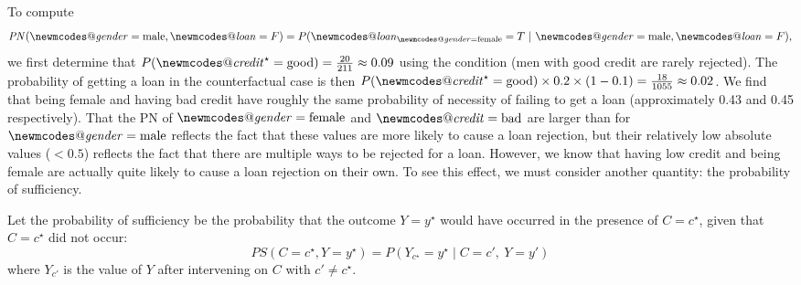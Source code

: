 \documentclass[anon,12pt]{clear2026} %
\makeatletter
\DeclareRobustCommand{\varname}[1]{\begingroup\newmcodes@\mathit{#1}\endgroup}
\newcommand{\pn}{\ensuremath{\mathit{PN}}}
\newcommand{\ps}{\ensuremath{\mathit{PS}}}
\makeatother
\begin{document}
To compute \[\pn(\varname{gender}=\text{male}, \varname{loan}=F) = P(\varname{loan}_{\varname{gender}=\text{female}} = T ~|~ \varname{gender}=\text{male}, \varname{loan} = F),\]
we first determine that $P(\varname{credit}^\star = \text{good}) = \frac{20}{211} \approx 0.09$ using the condition (men with good credit are rarely rejected).
The probability of getting a loan in the counterfactual case is then $P(\varname{credit}^\star = \text{good}) \times 0.2 \times (1 - 0.1) = \frac{18}{1055} \approx 0.02$.
We find that being female and having bad credit have roughly the same probability of necessity of failing to get a loan (approximately 0.43 and 0.45 respectively).
That the PN of $\varname{gender}=\text{female}$ and $\varname{credit}=\text{bad}$ are larger than for $\varname{gender}=\text{male}$ reflects the fact that these values are more likely to cause a loan rejection, but their relatively low absolute values ($< 0.5$) reflects the fact that there are multiple ways to be rejected for a loan.
However, we know that having low credit and being female are actually quite likely to cause a loan rejection on their own.
To see this effect, we must consider another quantity: the probability of sufficiency.

\begin{definition}
Let the probability of sufficiency be the probability that the outcome $Y=y^\star$ would have occurred in the presence of $C = c^\star$, given that $C=c^\star$ did not occur:
\[\ps(C = c^{\star}, Y = y^\star) =  P\!(Y_{c^\star} = y^\star \;\vert\;  C = c',\ Y = y')\]
where $Y_{c'}$ is the value of $Y$ after intervening on $C$ with $c'\neq c^\star$.
\end{definition}
\end{document}
